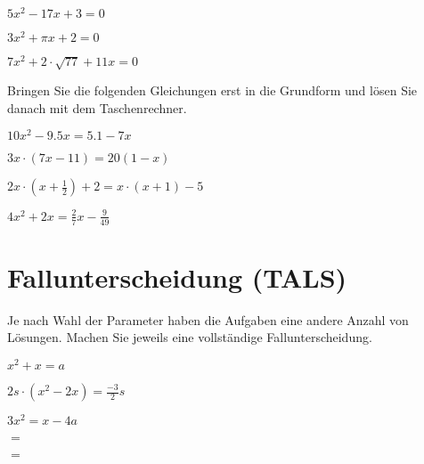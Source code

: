 \begin{bbwAufgabenBlock}
\item $ 5x^2-17x+3= 0$

\item $ 3x^2+\pi x + 2= 0$
\LoesungsBlock{$\lx= \left\{  \right\}$}

\item $ 7x^2 + 2\cdot{}\sqrt{77} + 11x= 0$

Bringen Sie die folgenden Gleichungen erst in die Grundform und lösen
Sie danach mit dem Taschenrechner.

\item $ 10x^2 -9.5x = 5.1 - 7x $

\item $ 3x\cdot{}(7x-11)= 20(1-x)$

\item $ 2x\cdot{}(x+\frac12) + 2 = x\cdot{}(x+1) -5 $
\LoesungsBlock{$\lx= \left\{   \right\}$}

\item $ 4x^2 + 2x = \frac27 x - \frac9{49} $


\end{bbwAufgabenBlock}
\newpage

\section{Fallunterscheidung (TALS)}

Je nach Wahl der Parameter haben die Aufgaben eine andere Anzahl von
Lösungen. Machen Sie jeweils eine vollständige Fallunterscheidung.


\begin{bbwAufgabenBlock}
\item $ x^2 + x= a$

\item $ 2s\cdot{}(x^2 -2x) = \frac{-3}2 s $

\item $ 3x^2 = x-4a$

\item $ = $
\LoesungsBlock{$\lx= \left\{ ;  \right\}$}

\item $ = $
\LoesungsBlock{$\lx= \left\{ ;  \right\}$}


\end{bbwAufgabenBlock}
\newpage


